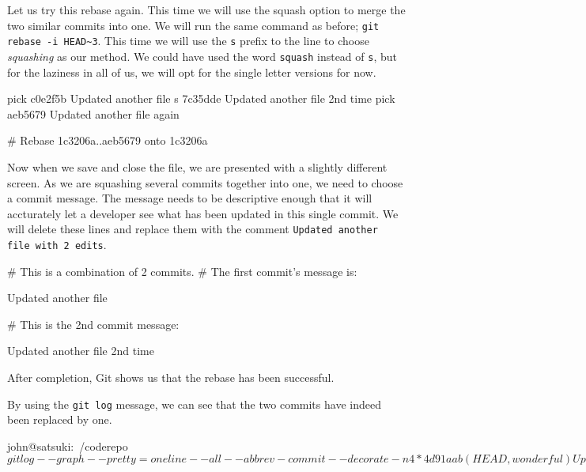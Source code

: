 Let us try this rebase again.
This time we will use the squash option to merge the two similar commits into one.
We will run the same command as before; \texttt{git rebase -i HEAD\textasciitilde3}.
This time we will use the \texttt{s} prefix to the line to choose \emph{squashing} as our method.
We could have used the word \texttt{squash} instead of \texttt{s}, but for the laziness in all of us, we will opt for the single letter versions for now.

\begin{code}
pick c0e2f5b Updated another file
s 7c35dde Updated another file 2nd time
pick aeb5679 Updated another file again

# Rebase 1c3206a..aeb5679 onto 1c3206a
\end{code}

Now when we save and close the file, we are presented with a slightly different screen.
As we are squashing several commits together into one, we need to choose a commit message.
The message needs to be descriptive enough that it will accturately let a developer see what has been updated in this single commit.
We will delete these lines and replace them with the comment \texttt{Updated another file with 2 edits}.

\begin{code}
# This is a combination of 2 commits.
# The first commit's message is:

Updated another file

# This is the 2nd commit message:

Updated another file 2nd time
\end{code}

After completion, Git shows us that the rebase has been successful.


By using the \texttt{git log} message, we can see that the two commits have indeed been replaced by one.

\begin{code}
john@satsuki:~/coderepo$ git log --graph --pretty=oneline --all --abbrev-commit --decorate -n 4
* 4d91aab (HEAD, wonderful) Updated another file again
* 1ffe37f Updated another file with 2 edits
* 1c3206a (master) Added a new file
* 37950f8 Continued Development
john@satsuki:~/coderepo$
\end{code}

